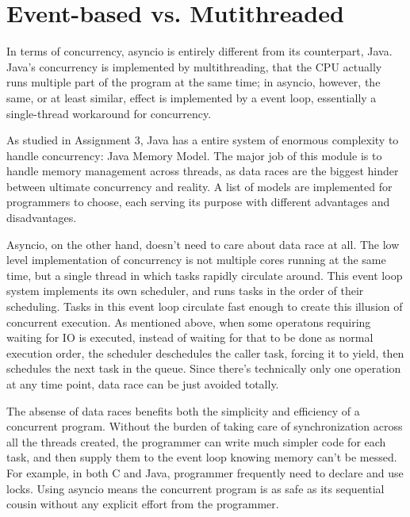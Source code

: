 \documentclass[letterpaper,twocolumn,10pt]{article}
\begin{document}
\section{Event-based vs. Mutithreaded}

In terms of concurrency, asyncio is entirely different from its counterpart, Java.
Java's concurrency is implemented by multithreading, that the CPU actually runs multiple part of the program at the same time;
in asyncio, however, the same, or at least similar, effect is implemented by a event loop, essentially a single-thread workaround for concurrency.

As studied in Assignment 3, Java has a entire system of enormous complexity to handle concurrency: Java Memory Model. 
The major job of this module is to handle memory management across threads, as data races are the biggest hinder between ultimate concurrency and reality. 
A list of models are implemented for programmers to choose, each serving its purpose with different advantages and disadvantages.

Asyncio, on the other hand, doesn't need to care about data race at all.
The low level implementation of concurrency is not multiple cores running at the same time, but a single thread in which tasks rapidly circulate around.
This event loop system implements its own scheduler, and runs tasks in the order of their scheduling.
Tasks in this event loop circulate fast enough to create this illusion of concurrent execution.
As mentioned above, when some operatons requiring waiting for IO is executed, instead of waiting for that to be done as normal execution order, the scheduler deschedules the caller task, forcing it to yield, then schedules the next task in the queue.
Since there's technically only one operation at any time point, data race can be just avoided totally.

The absense of data races benefits both the simplicity and efficiency of a concurrent program.
Without the burden of taking care of synchronization across all the threads created, the programmer can write much simpler code for each task, and then supply them to the event loop knowing memory can't be messed. 
For example, in both C and Java, programmer frequently need to declare and use locks.
Using asyncio means the concurrent program is as safe as its sequential cousin without any explicit effort from the programmer.
\end{document}
